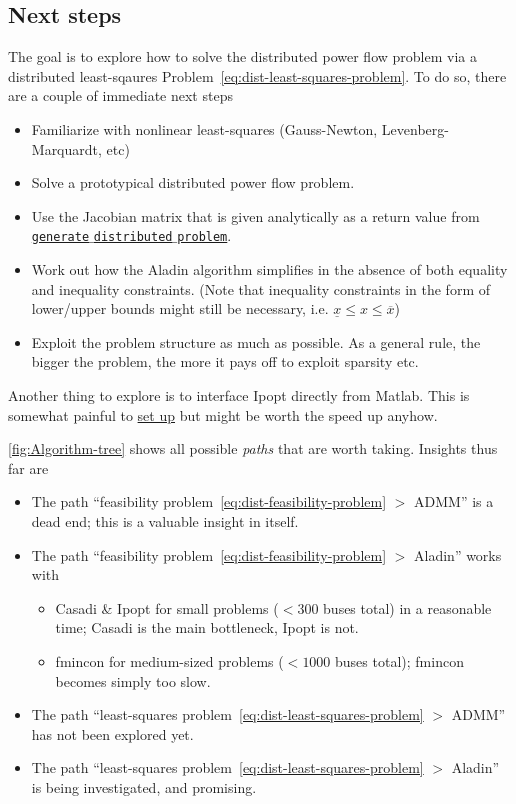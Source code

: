 \documentclass{article}
\begin{document}
\subsection{Next steps}

The goal is to explore how to solve the distributed power flow problem via a distributed least-sqaures Problem~\ref{eq:dist-least-squares-problem}.
To do so, there are a couple of immediate next steps
\begin{itemize}
    \item Familiarize with nonlinear least-squares (Gauss-Newton, Levenberg-Marquardt, etc)
    \item Solve a prototypical distributed power flow problem.
    \item Use the Jacobian matrix that is given analytically as a return value from \href{https://iai-vcs.iai.kit.edu/advancedcontrol/code/morenet/morenet/-/blob/master/03_parser/generate_distributed_problem.m}{\texttt{generate$\_$distributed$\_$problem}}.
    \item Work out how the Aladin algorithm simplifies in the absence of both equality and inequality constraints. (Note that inequality constraints in the form of lower/upper bounds might still be necessary, i.e. $\underline{x} \leq x \leq \overline{x}$)
    \item Exploit the problem structure as much as possible. As a general rule, the bigger the problem, the more it pays off to exploit sparsity etc.
\end{itemize}

Another thing to explore is to interface Ipopt directly from Matlab.
This is somewhat painful to \href{https://projects.coin-or.org/Ipopt/wiki/MatlabInterface}{set up} but might be worth the speed up anyhow.

\autoref{fig:Algorithm-tree} shows all possible \emph{paths} that are worth taking.
Insights thus far are

\begin{itemize}
    \item The path ``feasibility problem~\eqref{eq:dist-feasibility-problem} $>$ ADMM'' is a dead end; this is a valuable insight in itself.
    \item The path ``feasibility problem~\eqref{eq:dist-feasibility-problem} $>$ Aladin'' works with
    \begin{itemize}
        \item Casadi \& Ipopt for small problems ($< 300$ buses total) in a reasonable time; Casadi is the main bottleneck, Ipopt is not.
        \item fmincon for medium-sized problems ($< 1000$ buses total); fmincon becomes simply too slow.
    \end{itemize}
    \item The path ``least-squares problem~\eqref{eq:dist-least-squares-problem} $>$ ADMM'' has not been explored yet.
    \item The path ``least-squares problem~\eqref{eq:dist-least-squares-problem} $>$ Aladin'' is being investigated, and promising.
\end{itemize}
\end{document}
